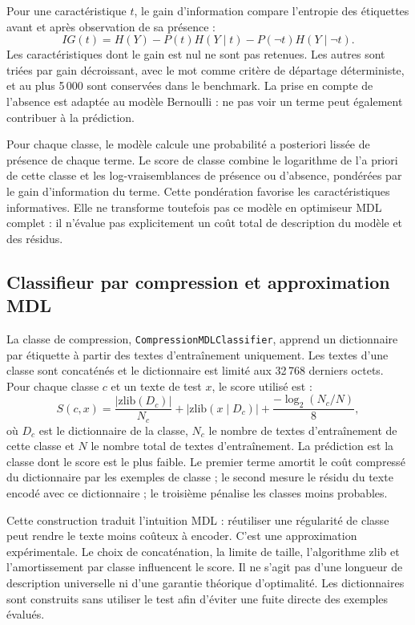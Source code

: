 \documentclass[11pt,a4paper]{article}
\begin{document}
Pour une caractéristique $t$, le gain d'information compare l'entropie des
étiquettes avant et après observation de sa présence :
\[
 IG(t)=H(Y)-P(t)H(Y\mid t)-P(\neg t)H(Y\mid\neg t).
\]
Les caractéristiques dont le gain est nul ne sont pas retenues. Les autres
sont triées par gain décroissant, avec le mot comme critère de départage
déterministe, et au plus 5\,000 sont conservées dans le benchmark.
La prise en compte de l'absence est adaptée au modèle Bernoulli : ne pas voir
un terme peut également contribuer à la prédiction.

Pour chaque classe, le modèle calcule une probabilité a posteriori lissée de
présence de chaque terme. Le score de classe combine le logarithme de l'a
priori de cette classe et les log-vraisemblances de présence ou d'absence,
pondérées par le gain d'information du terme. Cette pondération favorise les
caractéristiques informatives. Elle ne transforme toutefois pas ce modèle en
optimiseur MDL complet : il n'évalue pas explicitement un coût total de
description du modèle et des résidus.

\subsection{Classifieur par compression et approximation MDL}
La classe de compression, \texttt{CompressionMDLClassifier}, apprend un
dictionnaire par étiquette à partir des textes d'entraînement uniquement.
Les textes d'une classe sont concaténés et le dictionnaire est limité aux
32\,768 derniers octets. Pour chaque classe $c$ et un texte de test $x$, le
score utilisé est :
\[
 S(c,x) =
 \frac{|\mathrm{zlib}(D_c)|}{N_c}
 + |\mathrm{zlib}(x\mid D_c)|
 + \frac{-\log_2(N_c/N)}{8},
\]
où $D_c$ est le dictionnaire de la classe, $N_c$ le nombre de textes
d'entraînement de cette classe et $N$ le nombre total de textes
d'entraînement. La prédiction est la classe dont le score est le plus faible.
Le premier terme amortit le coût compressé du dictionnaire par les exemples
de classe ; le second mesure le résidu du texte encodé avec ce dictionnaire ;
le troisième pénalise les classes moins probables.

Cette construction traduit l'intuition MDL : réutiliser une régularité de
classe peut rendre le texte moins coûteux à encoder. C'est une approximation
expérimentale. Le choix de concaténation, la limite de taille, l'algorithme
zlib et l'amortissement par classe influencent le score. Il ne s'agit pas
d'une longueur de description universelle ni d'une garantie théorique
d'optimalité. Les dictionnaires sont construits sans utiliser le test afin
d'éviter une fuite directe des exemples évalués.
\end{document}
